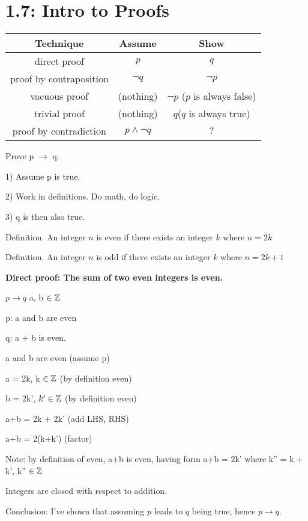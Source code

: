 \documentclass{exam}
\begin{document}
	\section{1.7: Intro to Proofs}

	\begin{tabular}{c|c|c}
		Technique&Assume&Show\\
		\hline
		direct proof&$p$&$q$\\
		proof by contraposition&$\neg q$&$\neg p$\\
		vacuous proof&(nothing)&$\neg p$ ($p$ is always false)\\
		trivial proof&(nothing)&$q$($q$ is always true)\\
		proof by contradiction&$p \wedge \neg q$&$?$\\
	\end{tabular} \newline

	Prove p $\rightarrow$ q.
	
	1) Assume p is true.
	
	2) Work in definitions. Do math, do logic.
	
	3) q is then also true.\newline
	
	Definition. An integer $n$ is even if there exists an integer $k$ where $n = 2k$\newline
	
	Definition. An integer $n$ is odd if there exists an integer $k$ where $n = 2k + 1$\newline
	
	\textbf{Direct proof: The sum of two even integers is even.}
	
	$p \rightarrow q$
	a, b $\in {\Bbb Z}$
	
	p: a and b are even
	
	q: a + b is even.
	
	a and b are even (assume p)
	
	a = 2k, k $\in {\Bbb Z}$ (by definition even)
	
	b = 2k', $k' \in {\Bbb Z}$ (by definition even)

	a+b = 2k + 2k' (add LHS, RHS)
	
	a+b = 2(k+k') (factor)
	
	Note: by definition of even, a+b is even, having form a+b = 2k' where k'' = k + k', k'' $\in {\Bbb Z}$
	
	Integers are closed with respect to addition. 
	
	Conclusion: I've shown that assuming $p$ leads to $q$ being true, hence $p \rightarrow q$.\newline
	
\end{document}
